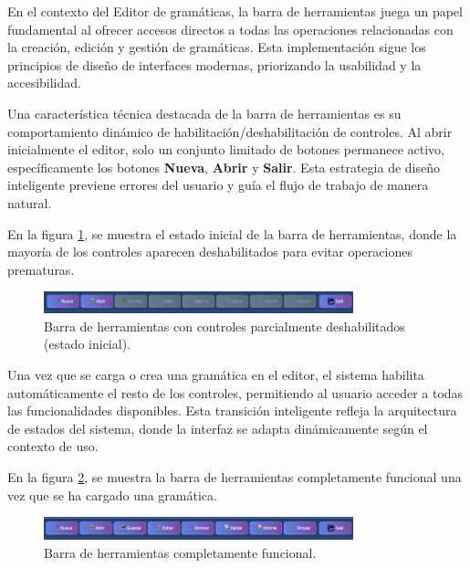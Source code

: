 En el contexto del Editor de gramáticas, la barra de herramientas juega un papel fundamental al ofrecer accesos directos a todas las operaciones relacionadas con la creación, edición y gestión de gramáticas. Esta implementación sigue los principios de diseño de interfaces modernas, priorizando la usabilidad y la accesibilidad.

Una característica técnica destacada de la barra de herramientas es su comportamiento dinámico de habilitación/deshabilitación de controles. Al abrir inicialmente el editor, solo un conjunto limitado de botones permanece activo, específicamente los botones \textbf{Nueva}, \textbf{Abrir} y \textbf{Salir}. Esta estrategia de diseño inteligente previene errores del usuario y guía el flujo de trabajo de manera natural.

En la figura \ref{fig:d2a}, se muestra el estado inicial de la barra de herramientas, donde la mayoría de los controles aparecen deshabilitados para evitar operaciones prematuras.

\needspace{3cm}
\begin{figure}[H]
\centering
\includegraphics[width=0.8\textwidth]{figuras2/editor/barra_herramientas_deshabilita_parcial.png}
\caption{Barra de herramientas con controles parcialmente deshabilitados (estado inicial).}
\label{fig:d2a}
\end{figure}

Una vez que se carga o crea una gramática en el editor, el sistema habilita automáticamente el resto de los controles, permitiendo al usuario acceder a todas las funcionalidades disponibles. Esta transición inteligente refleja la arquitectura de estados del sistema, donde la interfaz se adapta dinámicamente según el contexto de uso.

En la figura \ref{fig:d2}, se muestra la barra de herramientas completamente funcional una vez que se ha cargado una gramática.

\needspace{3cm}
\begin{figure}[H]
\centering
\includegraphics[width=0.8\textwidth]{figuras2/editor/barra_herramientas.png}
\caption{Barra de herramientas completamente funcional.}
\label{fig:d2}
\end{figure}


